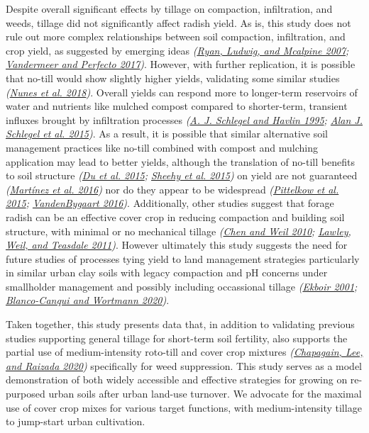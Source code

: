 \documentclass[
  12pt,
]{article}
\begin{document}
Despite overall significant effects by tillage on compaction, infiltration, and weeds, tillage did not significantly affect radish yield.
As is, this study does not rule out more complex relationships between soil compaction, infiltration, and crop yield, as suggested by emerging ideas \emph{(\protect\hyperlink{ref-ryan07}{Ryan, Ludwig, and Mcalpine 2007}; \protect\hyperlink{ref-vandermeer17}{Vandermeer and Perfecto 2017})}.
However, with further replication, it is possible that no-till would show slightly higher yields, validating some similar studies \emph{(\protect\hyperlink{ref-nunes18}{Nunes et al. 2018})}.
Overall yields can respond more to longer-term reservoirs of water and nutrients like mulched compost compared to shorter-term, transient influxes brought by infiltration processes \emph{(\protect\hyperlink{ref-schlegel95}{A. J. Schlegel and Havlin 1995}; \protect\hyperlink{ref-schlegel15}{Alan J. Schlegel et al. 2015})}.
As a result, it is possible that similar alternative soil management practices like no-till combined with compost and mulching application may lead to better yields, although the translation of no-till benefits to soil structure \emph{(\protect\hyperlink{ref-du15}{Du et al. 2015}; \protect\hyperlink{ref-sheehy15}{Sheehy et al. 2015})} on yield are not guaranteed \emph{(\protect\hyperlink{ref-martinez16}{Martínez et al. 2016})} nor do they appear to be widespread \emph{(\protect\hyperlink{ref-pittelkow15}{Pittelkow et al. 2015}; \protect\hyperlink{ref-vandenbygaart16}{VandenBygaart 2016})}.
Additionally, other studies suggest that forage radish can be an effective cover crop in reducing compaction and building soil structure, with minimal or no mechanical tillage \emph{(\protect\hyperlink{ref-chen10b}{Chen and Weil 2010}; \protect\hyperlink{ref-lawley11}{Lawley, Weil, and Teasdale 2011})}.
However ultimately this study suggests the need for future studies of processes tying yield to land management strategies particularly in similar urban clay soils with legacy compaction and pH concerns under smallholder management and possibly including occassional tillage \emph{(\protect\hyperlink{ref-ekboir01}{Ekboir 2001}; \protect\hyperlink{ref-blanco-canqui20}{Blanco-Canqui and Wortmann 2020})}.

Taken together, this study presents data that, in addition to validating previous studies supporting general tillage for short-term soil fertility, also supports the partial use of medium-intensity roto-till and cover crop mixtures \emph{(\protect\hyperlink{ref-chapagain20}{Chapagain, Lee, and Raizada 2020})} specifically for weed suppression.
This study serves as a model demonstration of both widely accessible and effective strategies for growing on re-purposed urban soils after urban land-use turnover.
We advocate for the maximal use of cover crop mixes for various target functions, with medium-intensity tillage to jump-start urban cultivation.
\end{document}
